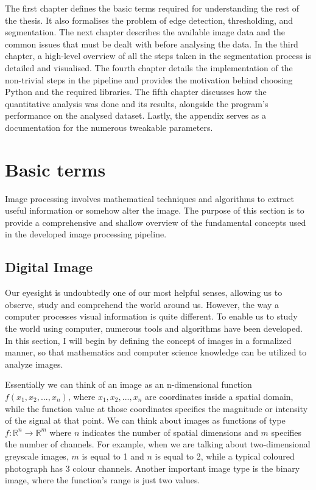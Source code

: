 \documentclass[
  digital,     %
  oneside,     %
  nosansbold,  %
  nocolorbold, %
  lof,         %
  lot,         %
]{fithesis4}
\newcommand*{\R}{\ensuremath{\mathbb{R}}}
\begin{document}
The first chapter defines the basic terms required for understanding the rest of the thesis. It also formalises the problem of edge detection, thresholding, and segmentation. The next chapter describes the available image data and the common issues that must be dealt with before analysing the data. In the third chapter, a high-level overview of all the steps taken in the segmentation process is detailed and visualised. The fourth chapter details the implementation of the non-trivial steps in the pipeline and provides the motivation behind choosing Python and the required libraries. The fifth chapter discusses how the quantitative analysis was done and its results, alongside the program's performance on the analysed dataset. Lastly, the appendix serves as a documentation for the numerous tweakable parameters.

\chapter{Basic terms}

Image processing involves mathematical techniques and algorithms
to extract useful information or somehow alter the image. The purpose of this
section is to provide a comprehensive and shallow overview of the fundamental
concepts used in the developed image processing pipeline.

\section{Digital Image}
Our eyesight is undoubtedly one of our most helpful senses, allowing us to
observe, study and comprehend the world around us. However, the way a computer
processes visual information is quite different. To enable us to study the world
using computer, numerous tools and algorithms have been developed. In this
section, I will begin by defining the concept of images in a formalized manner,
so that mathematics and computer science knowledge can be utilized to analyze
images.

Essentially we can think of an image as an n-dimensional function $f(x_1, x_2,
..., x_n)$, where $x_1, x_2, ..., x_n$ are coordinates inside a spatial domain,
while the function value at those coordinates specifies the magnitude or
intensity of the signal at that point. We can think about images as functions of
type $f:\R^n \rightarrow \R^m$ where $n$ indicates the number of spatial
dimensions and $m$ specifies the number of channels. For example, when we are
talking about two-dimensional greyscale images, $m$ is equal to 1 and $n$ is
equal to 2, while a typical coloured photograph has 3 colour channels. Another
important image type is the binary image, where the function's range is just two
values.
\end{document}
